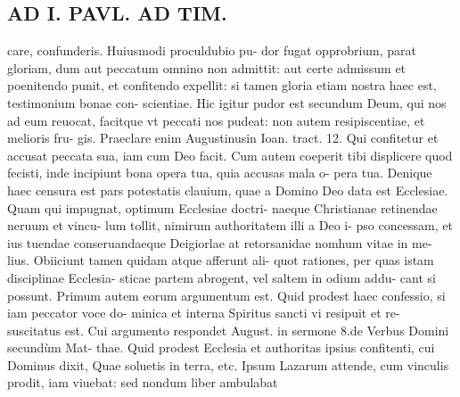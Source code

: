 \documentclass{article}
\begin{document}
\begin{pages}
\section*{AD I. PAVL. AD TIM. }
\marginpar{[ p.326 ]}\pstart care, confunderis. Huiusmodi proculdubio pu- dor fugat opprobrium, parat gloriam, dum aut peccatum omnino non admittit: aut certe admissum et poenitendo punit, et confitendo expellit: si tamen gloria etiam nostra haec est, testimonium bonae con- scientiae. Hic igitur pudor est secundum Deum, qui nos ad eum reuocat, facitque vt peccati nos pudeat: non autem resipiscentiae, et melioris fru- gis. Praeclare enim Augustinusin Ioan. tract. 12. Qui confitetur et accusat peccata sua, iam cum Deo facit. Cum autem coeperit tibi displicere quod fecisti, inde incipiunt bona opera tua, quia accusas mala o- pera tua. Denique haec censura est pars potestatis clauium, quae a Domino Deo data est Ecclesiae. Quam qui impugnat, optimum Ecclesiae doctri- naeque Christianae retinendae neruum et vincu- lum tollit, nimirum authoritatem illi a Deo i- pso concessam, et ius tuendae conseruandaeque Deigiorlae at retorsanidae nomhum vitae in me- lius.  \pend\pstart Obiiciunt tamen quidam atque afferunt ali- quot rationes, per quas istam disciplinae Ecclesia- sticae partem abrogent, vel saltem in odium addu- cant si possunt.  \pend\pstart Primum autem eorum argumentum est. Quid prodest haec confessio, si iam peccator voce do- minica et interna Spiritus sancti vi resipuit et re- suscitatus est. Cui argumento respondet August. in sermone 8.de Verbus  Domini secundùm Mat- thae. Quid prodest Ecclesia et authoritas ipsius confitenti, cui Dominus dixit, Quae soluetis in terra, etc. Ipsum Lazarum attende, cum vinculis prodit, iam viuebat: sed nondum liber ambulabat  \pend

\end{pages}
\end{document}
